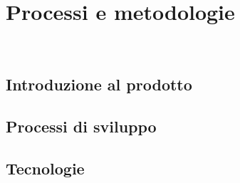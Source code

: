 \chapter{Processi e metodologie}
\label{cap:processi-metodologie}

\\

\section{Introduzione al prodotto}

\section{Processi di sviluppo}

\section{Tecnologie}


